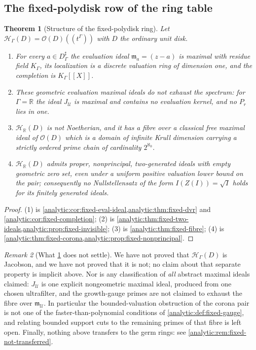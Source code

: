 \documentclass[11pt,letterpaper]{article}
\newtheorem{theorem}{Theorem}[section]
\theoremstyle{definition}
\theoremstyle{remark}
\newtheorem{remark}[theorem]{Remark}
\newcommand{\R}{\mathbb R}
\newcommand{\HH}{\mathcal H}
\newcommand{\UU}{\mathcal U}
\newcommand{\m}{\mathfrak m}
\newcommand{\OO}{\mathcal O}
\numberwithin{equation}{section}
\begin{document}
\subsection{The fixed-polydisk row of the ring table}
\label{analytic:subsec:fixed-summary}
\begin{theorem}[Structure of the fixed-polydisk ring]
\label{analytic:thm:fixed-structure}
Let $\HH_\Gamma(D)=\OO(D)((t^\Gamma))$ with $D$ the ordinary unit disk.
\begin{enumerate}
\item For every $a\in D^\sharp_\Gamma$ the evaluation ideal $\m_a=(z-a)$ is
maximal with residue field $K_\Gamma$, its localization is a discrete
valuation ring of dimension one, and the completion is $K_\Gamma[[X]]$.
\item These geometric evaluation maximal ideals do not exhaust the
spectrum: for $\Gamma=\R$ the ideal $J_\UU$ is maximal and contains no
evaluation kernel, and no $P_r$ lies in one.
\item $\HH_\R(D)$ is not Noetherian, and it has a fibre over a classical
free maximal ideal of $\OO(D)$ which is a domain of infinite Krull
dimension carrying a strictly ordered prime chain of cardinality
$2^{\aleph_0}$.
\item $\HH_\R(D)$ admits proper, nonprincipal, two-generated ideals with
empty geometric zero set, even under a uniform positive valuation lower
bound on the pair; consequently no Nullstellensatz of the form
$I(Z(I))=\sqrt I$ holds for its finitely generated ideals.
\end{enumerate}
\end{theorem}
\begin{proof}
(1) is \cref{analytic:cor:fixed-eval-ideal,analytic:thm:fixed-dvr}
and \cref{analytic:cor:fixed-completion}; (2) is
\cref{analytic:thm:fixed-two-ideals,analytic:prop:fixed-invisible}; (3) is
\cref{analytic:thm:fixed-fibre}; (4) is
\cref{analytic:thm:fixed-corona,analytic:prop:fixed-nonprincipal}.
\end{proof}

\begin{remark}[What \cref{analytic:thm:fixed-structure} does not settle]
\label{analytic:rem:fixed-open}
We have not proved that $\HH_\Gamma(D)$ is Jacobson, and we have not
proved that it is not; no claim about that separate property is implicit
above. Nor is any classification of \emph{all} abstract maximal ideals
claimed: $J_\UU$ is one explicit nongeometric maximal ideal, produced from
one chosen ultrafilter, and the growth-gauge primes are not claimed to
exhaust the fibre over $\m_\UU$. In particular the bounded-valuation
obstruction of the corona pair is not one of the faster-than-polynomial
conditions of \cref{analytic:def:fixed-gauge}, and relating bounded support
cuts to the remaining primes of that fibre is left open. Finally, nothing
above transfers to the germ rings: see
\cref{analytic:rem:fixed-not-transferred}.
\end{remark}
\end{document}

